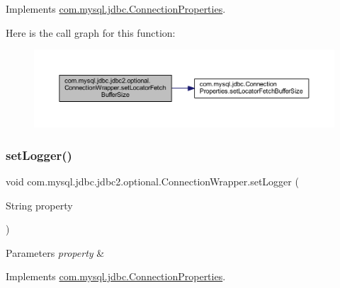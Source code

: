 Implements \mbox{\hyperlink{interfacecom_1_1mysql_1_1jdbc_1_1_connection_properties_ae7d48146159a39b7171b4b5a074466c1}{com.\+mysql.\+jdbc.\+Connection\+Properties}}.

Here is the call graph for this function\+:
\nopagebreak
\begin{figure}[H]
\begin{center}
\leavevmode
\includegraphics[width=350pt]{classcom_1_1mysql_1_1jdbc_1_1jdbc2_1_1optional_1_1_connection_wrapper_a81b230b8f38e3faa698214cb79cb03b6_cgraph}
\end{center}
\end{figure}
\mbox{\label{classcom_1_1mysql_1_1jdbc_1_1jdbc2_1_1optional_1_1_connection_wrapper_ab982b5f1ecb96624a273f3a120971b09}} 
\subsubsection{\texorpdfstring{set\+Logger()}{setLogger()}}
{\footnotesize\ttfamily void com.\+mysql.\+jdbc.\+jdbc2.\+optional.\+Connection\+Wrapper.\+set\+Logger (\begin{DoxyParamCaption}\item[{String}]{property }\end{DoxyParamCaption})}


\begin{DoxyParams}{Parameters}
{\em property} & \\
\hline
\end{DoxyParams}


Implements \mbox{\hyperlink{interfacecom_1_1mysql_1_1jdbc_1_1_connection_properties_a9ad6baf8983bc1bf352b58b0e1634be1}{com.\+mysql.\+jdbc.\+Connection\+Properties}}.

